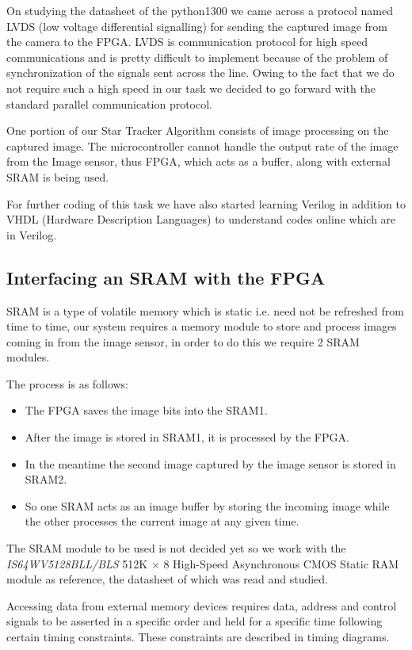 On studying the datasheet of the python1300 we came across a protocol named LVDS (low voltage differential signalling) for sending the captured image from the camera to the FPGA. LVDS is communication protocol for high speed communications and is pretty difficult to implement because of the problem of synchronization of the signals sent across the line. Owing to the fact that we do not require such a high speed in our task we decided to go forward with the standard parallel communication protocol.

One portion of our Star Tracker Algorithm consists of image processing on the captured image.  The microcontroller cannot handle the output rate of the image from the Image sensor, thus FPGA, which acts as a buffer, along with external SRAM is being used. %

For further coding of this task we have also started learning Verilog in addition to VHDL (Hardware Description Languages) to understand codes online which are in Verilog.

\subsection{Interfacing an SRAM with the FPGA}
SRAM is a type of volatile memory which is static i.e. need not be refreshed from time to time, our system requires a memory module to store and process images coming in from the image sensor, in order to do this we require 2 SRAM modules.

The process is as follows:
\begin{itemize}
    \item The FPGA saves the image bits into the SRAM1.
    \item After the image is stored in SRAM1, it is processed by the FPGA.
    \item In the meantime the second image captured by the image sensor is stored in SRAM2.
    \item So one SRAM acts as an image buffer by storing the incoming image while the other processes the current image at any given time.
\end{itemize}

The SRAM module to be used is not decided yet so we work with the \textit{IS64WV5128BLL/BLS} 512K \(\times\) 8 High-Speed Asynchronous CMOS Static RAM module as reference, the datasheet of which was read and studied.

Accessing data from external memory devices requires data, address and control signals to be asserted in a specific order and held for a specific time following certain timing constraints. These constraints are described in timing diagrams.

